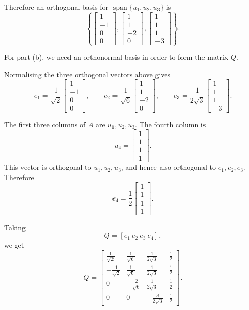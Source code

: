 \documentclass[12pt]{article}
\newcommand{\Span}{\operatorname{span}}
\begin{document}
Therefore an orthogonal basis for $\Span\{u_1,u_2,u_3\}$ is
\[
\boxed{
\left\{
\begin{bmatrix}1\\-1\\0\\0\end{bmatrix},
\begin{bmatrix}1\\1\\-2\\0\end{bmatrix},
\begin{bmatrix}1\\1\\1\\-3\end{bmatrix}
\right\}.}
\]

For part (b), we need an orthonormal basis in order to form the matrix $Q$.

Normalising the three orthogonal vectors above gives
\[
e_1=\frac1{\sqrt2}
\begin{bmatrix}1\\-1\\0\\0\end{bmatrix},
\qquad
e_2=\frac1{\sqrt6}
\begin{bmatrix}1\\1\\-2\\0\end{bmatrix},
\qquad
e_3=\frac1{2\sqrt3}
\begin{bmatrix}1\\1\\1\\-3\end{bmatrix}.
\]

The first three columns of $A$ are $u_1,u_2,u_3$. The fourth column is
\[
u_4=\begin{bmatrix}1\\1\\1\\1\end{bmatrix}.
\]
This vector is orthogonal to $u_1,u_2,u_3$, and hence also orthogonal to $e_1,e_2,e_3$. Therefore
\[
e_4=\frac12
\begin{bmatrix}1\\1\\1\\1\end{bmatrix}.
\]

Taking
\[
Q=[e_1\ e_2\ e_3\ e_4],
\]
we get
\[
Q=
\begin{bmatrix}
\frac1{\sqrt2}&\frac1{\sqrt6}&\frac1{2\sqrt3}&\frac12\\[0.3em]
-\frac1{\sqrt2}&\frac1{\sqrt6}&\frac1{2\sqrt3}&\frac12\\[0.3em]
0&-\frac2{\sqrt6}&\frac1{2\sqrt3}&\frac12\\[0.3em]
0&0&-\frac3{2\sqrt3}&\frac12
\end{bmatrix}.
\]
\end{document}
